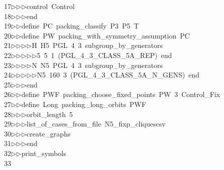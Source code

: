 \begin{tabbing}
17\>$\triangleright$\>$\triangleright$\>$\triangleright$\>control\ Control\ \\[0pt]
18\>$\triangleright$\>$\triangleright$\>$\triangleright$\>end\ \\[0pt]
19\>$\triangleright$\>$\triangleright$\>define\ PC\ packing\_classify\ P3\ P5\ T\ \\[0pt]
20\>$\triangleright$\>$\triangleright$\>define\ PW\ packing\_with\_symmetry\_assumption\ PC\ \\[0pt]
21\>$\triangleright$\>$\triangleright$\>$\triangleright$\>$\triangleright$\>H\ H5\ PGL\ 4\ 3\ subgroup\_by\_generators\ \\[0pt]
22\>$\triangleright$\>$\triangleright$\>$\triangleright$\>$\triangleright$\>$\triangleright$\>5\ 5\ 1\ (PGL\_4\_3\_CLASS\_5A\_REP)\ end\ \\[0pt]
23\>$\triangleright$\>$\triangleright$\>$\triangleright$\>$\triangleright$\>N\ N5\ PGL\ 4\ 3\ subgroup\_by\_generators\ \\[0pt]
24\>$\triangleright$\>$\triangleright$\>$\triangleright$\>$\triangleright$\>$\triangleright$\>N5\ 160\ 3\ (PGL\_4\_3\_CLASS\_5A\_N\_GENS)\ end\ \\[0pt]
25\>$\triangleright$\>$\triangleright$\>$\triangleright$\>end\ \\[0pt]
26\>$\triangleright$\>$\triangleright$\>define\ PWF\ packing\_choose\_fixed\_points\ PW\ 3\ Control\_Fix\ \\[0pt]
27\>$\triangleright$\>$\triangleright$\>define\ Long\ packing\_long\_orbits\ PWF\ \\[0pt]
28\>$\triangleright$\>$\triangleright$\>$\triangleright$\>orbit\_length\ 5\ \\[0pt]
29\>$\triangleright$\>$\triangleright$\>$\triangleright$\>list\_of\_cases\_from\_file\ N5\_fixp\_cliquescsv\ \\[0pt]
30\>$\triangleright$\>$\triangleright$\>$\triangleright$\>create\_graphs\ \\[0pt]
31\>$\triangleright$\>$\triangleright$\>$\triangleright$\>end\ \\[0pt]
32\>$\triangleright$\>$\triangleright$\>print\_symbols\\[0pt]
33\>\end{tabbing}
